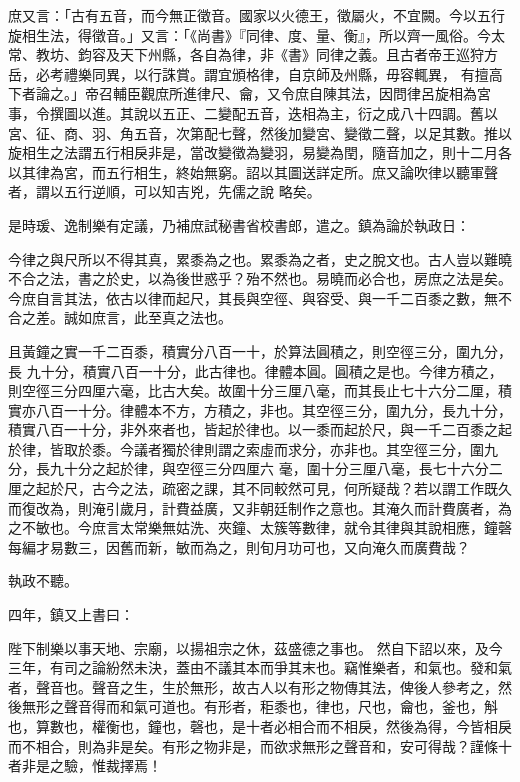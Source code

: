\begin{pinyinscope}
 庶又言：「古有五音，而今無正徵音。國家以火德王，徵屬火，不宜闕。今以五行旋相生法，得徵音。」又言：「《尚書》『同律、度、量、衡』，所以齊一風俗。今太常、教坊、鈞容及天下州縣，各自為律，非《書》同律之義。且古者帝王巡狩方岳，必考禮樂同異，以行誅賞。謂宜頒格律，自京師及州縣，毋容輒異，
 有擅高下者論之。」帝召輔臣觀庶所進律尺、龠，又令庶自陳其法，因問律呂旋相為宮事，令撰圖以進。其說以五正、二變配五音，迭相為主，衍之成八十四調。舊以宮、征、商、羽、角五音，次第配七聲，然後加變宮、變徵二聲，以足其數。推以旋相生之法謂五行相戾非是，當改變徵為變羽，易變為閏，隨音加之，則十二月各以其律為宮，而五行相生，終始無窮。詔以其圖送詳定所。庶又論吹律以聽軍聲者，謂以五行逆順，可以知吉兇，先儒之說
 略矣。



 是時瑗、逸制樂有定議，乃補庶試秘書省校書郎，遣之。鎮為論於執政日：



 今律之與尺所以不得其真，累黍為之也。累黍為之者，史之脫文也。古人豈以難曉不合之法，書之於史，以為後世惑乎？殆不然也。易曉而必合也，房庶之法是矣。今庶自言其法，依古以律而起尺，其長與空徑、與容受、與一千二百黍之數，無不合之差。誠如庶言，此至真之法也。



 且黃鐘之實一千二百黍，積實分八百一十，於算法圓積之，則空徑三分，圍九分，長
 九十分，積實八百一十分，此古律也。律體本圓。圓積之是也。今律方積之，則空徑三分四厘六毫，比古大矣。故圍十分三厘八毫，而其長止七十六分二厘，積實亦八百一十分。律體本不方，方積之，非也。其空徑三分，圍九分，長九十分，積實八百一十分，非外來者也，皆起於律也。以一黍而起於尺，與一千二百黍之起於律，皆取於黍。今議者獨於律則謂之索虛而求分，亦非也。其空徑三分，圍九分，長九十分之起於律，與空徑三分四厘六
 毫，圍十分三厘八毫，長七十六分二厘之起於尺，古今之法，疏密之課，其不同較然可見，何所疑哉？若以謂工作既久而復改為，則淹引歲月，計費益廣，又非朝廷制作之意也。其淹久而計費廣者，為之不敏也。今庶言太常樂無姑洗、夾鐘、太簇等數律，就令其律與其說相應，鐘磬每編才易數三，因舊而新，敏而為之，則旬月功可也，又向淹久而廣費哉？



 執政不聽。



 四年，鎮又上書曰：



 陛下制樂以事天地、宗廟，以揚祖宗之休，茲盛德之事也。
 然自下詔以來，及今三年，有司之論紛然未決，蓋由不議其本而爭其末也。竊惟樂者，和氣也。發和氣者，聲音也。聲音之生，生於無形，故古人以有形之物傳其法，俾後人參考之，然後無形之聲音得而和氣可道也。有形者，秬黍也，律也，尺也，龠也，釜也，斛也，算數也，權衡也，鐘也，磬也，是十者必相合而不相戾，然後為得，今皆相戾而不相合，則為非是矣。有形之物非是，而欲求無形之聲音和，安可得哉？謹條十者非是之驗，惟裁擇焉！




\end{pinyinscope}
